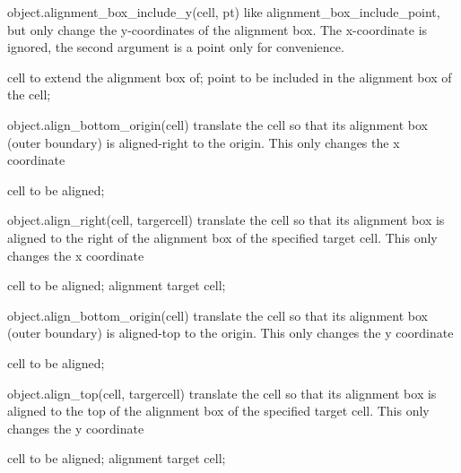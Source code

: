 \begin{APIfunc}{object.alignment\_box\_include\_y(cell, pt)}
    like alignment\_box\_include\_point, but only change the y-coordinates of the alignment box. The x-coordinate is ignored, the second argument is a point only for convenience.
    \begin{APIparameters}
            cell to extend the alignment box of;
            point to be included in the alignment box of the cell;
    \end{APIparameters}
\end{APIfunc}
\begin{APIfunc}{object.align\_bottom\_origin(cell)}
    translate the cell so that its alignment box (outer boundary) is aligned-right to the origin. This only changes the x coordinate
    \begin{APIparameters}
            cell to be aligned;
    \end{APIparameters}
\end{APIfunc}
\begin{APIfunc}{object.align\_right(cell, targercell)}
    translate the cell so that its alignment box is aligned to the right of the alignment box of the specified target cell. This only changes the x coordinate
    \begin{APIparameters}
            cell to be aligned;
            alignment target cell;
    \end{APIparameters}
\end{APIfunc}
\begin{APIfunc}{object.align\_bottom\_origin(cell)}
    translate the cell so that its alignment box (outer boundary) is aligned-top to the origin. This only changes the y coordinate
    \begin{APIparameters}
            cell to be aligned;
    \end{APIparameters}
\end{APIfunc}
\begin{APIfunc}{object.align\_top(cell, targercell)}
    translate the cell so that its alignment box is aligned to the top of the alignment box of the specified target cell. This only changes the y coordinate
    \begin{APIparameters}
            cell to be aligned;
            alignment target cell;
    \end{APIparameters}
\end{APIfunc}
